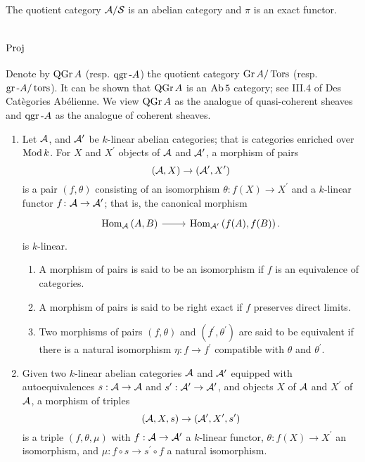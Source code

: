 \documentclass[dissertation.tex]{subfiles}
\begin{document}
\begin{prop}
  The quotient category $\mathcal{A}/\mathcal{S}$ is an abelian category and $\pi$ is an exact functor.
\end{prop}

\section{$\operatorname{Proj}$}
Denote by $\operatorname{QGr}A$ (resp. $\operatorname{qgr}\text{-}A$) the quotient category $\Gr{A}/\Tors$ (resp. $\operatorname{gr}\text{-}A/\operatorname{tors}$).
It can be shown that $\operatorname{QGr}A$ is an $\operatorname{Ab} 5$ category; see III.4 of Des Cat\`{e}gories Ab\'{e}lienne.
We view $\operatorname{QGr}A$ as the analogue of quasi-coherent sheaves and $\operatorname{qgr}\text{-}A$ as the analogue of coherent sheaves.

\begin{defn}
  \begin{enumerate}
  \item
    Let $\mathcal{A}$, and $\mathcal{A}^\prime$ be $k$-linear abelian categories; that is categories enriched over $\operatorname{Mod}k$.
    For $X$ and $X^\prime$ objects of $\mathcal{A}$ and $\mathcal{A}^\prime$, a morphism of pairs
    $$(\mathcal{A}, X) \rightarrow (\mathcal{A}^\prime, X^\prime)$$
    is a pair $(f, \theta)$ consisting of an isomorphism $\theta \colon f(X) \rightarrow X^\prime$ and a $k$-linear functor $f \colon \mathcal{A} \rightarrow \mathcal{A}^\prime$; that is, the canonical morphism
    $$\begin{tikzcd}
      \Hom{\A}{A,B}\arrow{r}& \Hom{\A^\prime}{f(A), f(B)}.
    \end{tikzcd}$$
    is $k$-linear.
    \begin{enumerate}
    \item
      A morphism of pairs is said to be an isomorphism if $f$ is an equivalence of categories.
    \item
      A morphism of pairs is said to be right exact if $f$ preserves direct limits.
    \item
      Two morphisms of pairs $(f,\theta)$ and $(f^\prime, \theta^\prime)$ are said to be equivalent if there is a natural isomorphism $\eta \colon f \rightarrow f^\prime$ compatible with $\theta$ and $\theta^\prime$.
    \end{enumerate}
  \item
    Given two $k$-linear abelian categories $\mathcal{A}$ and $\mathcal{A}^\prime$ equipped with autoequivalences $s : \mathcal{A} \rightarrow \mathcal{A}$ and $s^\prime : \mathcal{A}^\prime \rightarrow \mathcal{A}^\prime$, and objects $X$ of $\mathcal{A}$ and $X^\prime$ of $\mathcal{A}$, a morphism of triples
    $$(\mathcal{A}, X, s) \rightarrow (\mathcal{A}^\prime, X^\prime, s^\prime)$$
    is a triple $(f, \theta, \mu)$ with $f : \mathcal{A} \rightarrow \mathcal{A}^\prime$ a $k$-linear functor, $\theta : f(X) \rightarrow X^\prime$ an isomorphism, and $\mu : f \circ s \rightarrow s^\prime \circ f$ a natural isomorphism.

\end{enumerate}
\end{defn}
\end{document}
